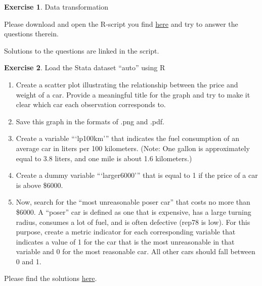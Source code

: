 \documentclass[
  12pt,
  oneside]{book}
\theoremstyle{definition}
\theoremstyle{definition}
\theoremstyle{definition}
\newtheorem{exercise}{Exercise}[chapter]
\theoremstyle{definition}
\theoremstyle{remark}
\begin{document}
\begin{exercise}
\protect\hypertarget{exr:exer4ds}{}\label{exr:exer4ds}Data transformation

Please download and open the R-script you find \href{https://raw.githubusercontent.com/hubchev/courses/main/scr/data_transformation.R}{here} and try to answer the questions therein.

Solutions to the questions are linked in the script.
\end{exercise}

\begin{exercise}
\protect\hypertarget{exr:exeposer}{}\label{exr:exeposer}Load the Stata dataset ``auto'' using R
\end{exercise}

\begin{enumerate}
\def\labelenumi{\arabic{enumi}.}
\item
  Create a scatter plot illustrating the relationship between the price and weight of a car. Provide a meaningful title for the graph and try to make it clear which car each observation corresponds to.
\item
  Save this graph in the formats of .png and .pdf.
\item
  Create a variable ```lp100km''' that indicates the fuel consumption of an average car in liters per 100 kilometers. (Note: One gallon is approximately equal to 3.8 liters, and one mile is about 1.6 kilometers.)
\item
  Create a dummy variable ```larger6000''' that is equal to 1 if the price of a car is above \$6000.
\item
  Now, search for the ``most unreasonable poser car'' that costs no more than \$6000. A ``poser'' car is defined as one that is expensive, has a large turning radius, consumes a lot of fuel, and is often defective (rep78 is low). For this purpose, create a metric indicator for each corresponding variable that indicates a value of 1 for the car that is the most unreasonable in that variable and 0 for the most reasonable car. All other cars should fall between 0 and 1.
\end{enumerate}

Please find the solutions \href{https://raw.githubusercontent.com/hubchev/courses/main/scr/exe_poser.R}{here}.
\end{document}
